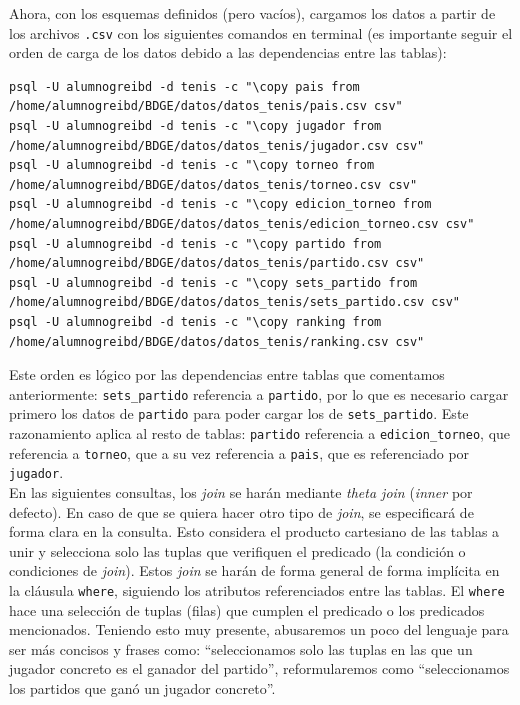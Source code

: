 \documentclass[11pt]{opticajnl}
\begin{document}
Ahora, con los esquemas definidos (pero vacíos), cargamos los datos a partir de los archivos \texttt{.csv} con los siguientes comandos en terminal (es importante seguir el orden de carga de los datos debido a las dependencias entre las tablas):

\begin{lstlisting}[style=terminal]
psql -U alumnogreibd -d tenis -c "\copy pais from /home/alumnogreibd/BDGE/datos/datos_tenis/pais.csv csv"
psql -U alumnogreibd -d tenis -c "\copy jugador from /home/alumnogreibd/BDGE/datos/datos_tenis/jugador.csv csv"
psql -U alumnogreibd -d tenis -c "\copy torneo from /home/alumnogreibd/BDGE/datos/datos_tenis/torneo.csv csv"
psql -U alumnogreibd -d tenis -c "\copy edicion_torneo from /home/alumnogreibd/BDGE/datos/datos_tenis/edicion_torneo.csv csv"
psql -U alumnogreibd -d tenis -c "\copy partido from /home/alumnogreibd/BDGE/datos/datos_tenis/partido.csv csv"
psql -U alumnogreibd -d tenis -c "\copy sets_partido from /home/alumnogreibd/BDGE/datos/datos_tenis/sets_partido.csv csv"
psql -U alumnogreibd -d tenis -c "\copy ranking from /home/alumnogreibd/BDGE/datos/datos_tenis/ranking.csv csv"
\end{lstlisting}

Este orden es lógico por las dependencias entre tablas que comentamos anteriormente: \texttt{sets\_partido} referencia a \texttt{partido}, por lo que es necesario cargar primero los datos de \texttt{partido} para poder cargar los de \texttt{sets\_partido}. Este razonamiento aplica al resto de tablas: \texttt{partido} referencia a \texttt{edicion\_torneo}, que referencia a \texttt{torneo}, que a su vez referencia a \texttt{pais}, que es referenciado por \texttt{jugador}. \\

En las siguientes consultas, los \textit{join} se harán mediante \textit{theta join} (\textit{inner} por defecto). En caso de que se quiera hacer otro tipo de \textit{join}, se especificará de forma clara en la consulta. Esto considera el producto cartesiano de las tablas a unir y selecciona solo las tuplas que verifiquen el predicado (la condición o condiciones de \textit{join}). Estos \textit{join} se harán de forma general de forma implícita en la cláusula \texttt{where}, siguiendo los atributos referenciados entre las tablas. El \texttt{where} hace una selección de tuplas (filas) que cumplen el predicado o los predicados mencionados. Teniendo esto muy presente, abusaremos un poco del lenguaje para ser más concisos y frases como: ``seleccionamos solo las tuplas en las que un jugador concreto es el ganador del partido'', reformularemos como ``seleccionamos los partidos que ganó un jugador concreto''. \\
\end{document}
